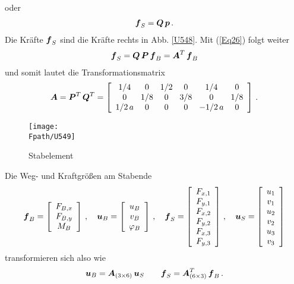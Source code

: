 oder
\begin{align}
\vek f_S = \vek Q\,\vek p\,.
\end{align}
Die Kr\"{a}fte $\vek f_S$ sind die Kr\"{a}fte rechts in Abb. \ref{U548}.
Mit (\ref{Eq26}) folgt weiter
\begin{align}
\vek f_S = \vek Q\,\vek P\,\vek f_B = \vek A^T\,\vek f_B
\end{align}
und somit lautet die Transformationsmatrix
\begin{align}\label{Eq27}
\vek A = \vek P^T\,\vek Q^T = \left[\barr{c @{\hspace{3mm}} c @{\hspace{3mm}} c @{\hspace{3mm}} c
@{\hspace{3mm}} c @{\hspace{3mm}} c} 1/4 & 0 &1/2 & 0 &1/4 & 0 \\
0 &1/8 & 0 &3/8 &0 &1/8\\
1/2\,a & 0 & 0& 0  &-1/2\,a & 0\earr \right]\,.
\end{align}
\begin{figure}[tbp]
\if {} \sidecaption[t] \fi
\centering
\texttt{[image: \\Fpath/U549]}
\caption{Stabelement }
\label{U549}
\end{figure}%
Die Weg- und Kraftgr\"{o}{\ss}en am Stabende
\begin{align}
\vek f_B = \left[\barr{c} F_{B,x} \\ F_{B,y} \\ M_{B} \earr \right]\,, \quad
\vek u_B = \left[\barr{c} u_B \\ v_B \\ \Np_B \earr \right]\,,\quad
\vek f_S = \left[\barr{c} F_{x,1} \\ F_{y,1} \\ F_{x,2} \\ F_{y,2} \\ F_{x,3} \\ F_{y,3}\earr \right]\,,\quad
\vek u_S = \left[\barr{c} u_1 \\ v_1 \\ u_2 \\ v_2 \\ u_3 \\ v_3 \earr \right]
\end{align}
transformieren sich also wie
\begin{align} \label{Eq990}
\vek u_B = \vek A_{(3 \times 6)}\,\vek u_S \qquad \vek f_S = \vek A^T_{(6 \times 3)}\,\vek f_B\,.
\end{align}
